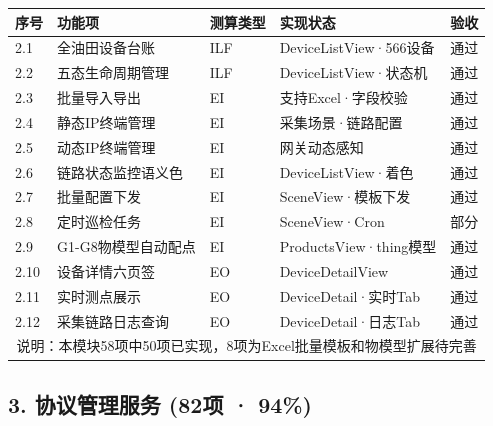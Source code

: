 \documentclass[11pt,a4paper]{ctexart}
\begin{document}
\begin{longtable}{p{1cm}p{4cm}p{3cm}p{3cm}p{2.5cm}}
\toprule
\textbf{序号} & \textbf{功能项} & \textbf{测算类型} & \textbf{实现状态} & \textbf{验收} \\
\midrule
2.1 & 全油田设备台账 & ILF & DeviceListView·566设备 & \color{ok}通过 \\
2.2 & 五态生命周期管理 & ILF & DeviceListView·状态机 & \color{ok}通过 \\
2.3 & 批量导入导出 & EI & 支持Excel·字段校验 & \color{ok}通过 \\
2.4 & 静态IP终端管理 & EI & 采集场景·链路配置 & \color{ok}通过 \\
2.5 & 动态IP终端管理 & EI & 网关动态感知 & \color{ok}通过 \\
2.6 & 链路状态监控语义色 & EI & DeviceListView·着色 & \color{ok}通过 \\
2.7 & 批量配置下发 & EI & SceneView·模板下发 & \color{ok}通过 \\
2.8 & 定时巡检任务 & EI & SceneView·Cron & \color{warn}部分 \\
2.9 & G1-G8物模型自动配点 & EI & ProductsView·thing模型 & \color{ok}通过 \\
2.10 & 设备详情六页签 & EO & DeviceDetailView & \color{ok}通过 \\
2.11 & 实时测点展示 & EO & DeviceDetail·实时Tab & \color{ok}通过 \\
2.12 & 采集链路日志查询 & EO & DeviceDetail·日志Tab & \color{ok}通过 \\
\midrule
\multicolumn{5}{c}{说明：本模块58项中50项已实现，8项为Excel批量模板和物模型扩展待完善} \\
\bottomrule
\end{longtable}

\subsection{3. 协议管理服务 (82项 · 94\%)}
\end{document}

